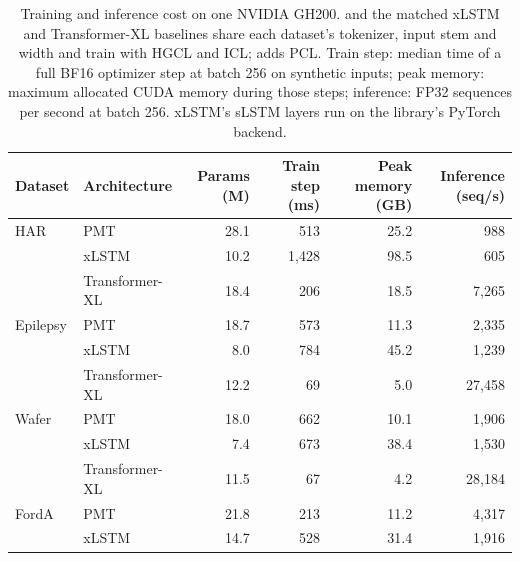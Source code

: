 \providecommand{\sd}[1]{\textsubscript{$\pm$#1}}
\providecommand{\revtab}[1]{#1}
\providecommand{\rev}[1]{#1}
\begin{table}[tb]
  \centering
  \footnotesize
  \caption{\revtab{\rev{Training and inference cost on one NVIDIA GH200. \METHODNAME and the matched xLSTM and Transformer-XL baselines share each dataset's tokenizer, input stem and width and train with HGCL and ICL; \METHODNAME adds PCL. Train step: median time of a full BF16 optimizer step at batch 256 on synthetic inputs; peak memory: maximum allocated CUDA memory during those steps; inference: FP32 sequences per second at batch 256. xLSTM's sLSTM layers run on the library's PyTorch backend.}}}
  \label{tab:arch-cost}
\begin{tabular}{llrrrr}
\toprule
Dataset & Architecture & Params (M) & Train step (ms) & Peak memory (GB) & Inference (seq/s) \\
\midrule
HAR & PMT & 28.1 & 513 & 25.2 & 988 \\
 & xLSTM & 10.2 & 1{,}428 & 98.5 & 605 \\
 & Transformer-XL & 18.4 & 206 & 18.5 & 7{,}265 \\
\addlinespace
Epilepsy & PMT & 18.7 & 573 & 11.3 & 2{,}335 \\
 & xLSTM & 8.0 & 784 & 45.2 & 1{,}239 \\
 & Transformer-XL & 12.2 & 69 & 5.0 & 27{,}458 \\
\addlinespace
Wafer & PMT & 18.0 & 662 & 10.1 & 1{,}906 \\
 & xLSTM & 7.4 & 673 & 38.4 & 1{,}530 \\
 & Transformer-XL & 11.5 & 67 & 4.2 & 28{,}184 \\
\addlinespace
FordA & PMT & 21.8 & 213 & 11.2 & 4{,}317 \\
 & xLSTM & 14.7 & 528 & 31.4 & 1{,}916 \\

\end{tabular}
\end{table}
